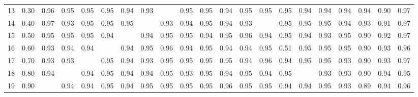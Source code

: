 \begin{table}[ht]
\begin{tabular}{rrrrrrrrrrrrrrrrrrrrr}
  13 & 0.30 & 0.96 & 0.95 & 0.95 & 0.95 & 0.94 & 0.93 &  & 0.95 & 0.95 & 0.94 & 0.95 & 0.95 & 0.95 & 0.94 & 0.94 & 0.94 & 0.94 & 0.90 & 0.97 \\ 
  14 & 0.40 & 0.97 & 0.93 & 0.95 & 0.95 & 0.95 &  & 0.93 & 0.94 & 0.95 & 0.94 & 0.93 &  & 0.95 & 0.95 & 0.95 & 0.94 & 0.93 & 0.91 & 0.97 \\ 
  15 & 0.50 & 0.95 & 0.95 & 0.95 & 0.94 &  & 0.94 & 0.95 & 0.95 & 0.94 & 0.95 & 0.96 & 0.94 & 0.95 & 0.94 & 0.93 & 0.95 & 0.90 & 0.92 & 0.97 \\ 
  16 & 0.60 & 0.93 & 0.94 & 0.94 &  & 0.94 & 0.95 & 0.96 & 0.94 & 0.95 & 0.94 & 0.94 & 0.95 & 0.51 & 0.95 & 0.95 & 0.95 & 0.90 & 0.93 & 0.96 \\ 
  17 & 0.70 & 0.93 & 0.93 &  & 0.95 & 0.94 & 0.93 & 0.95 & 0.95 & 0.95 & 0.95 & 0.94 & 0.96 & 0.94 & 0.95 & 0.95 & 0.93 & 0.90 & 0.93 & 0.97 \\ 
  18 & 0.80 & 0.94 &  & 0.94 & 0.95 & 0.94 & 0.94 & 0.95 & 0.93 & 0.95 & 0.94 & 0.95 & 0.94 & 0.95 &  & 0.93 & 0.93 & 0.90 & 0.94 & 0.95 \\ 
  19 & 0.90 &  & 0.94 & 0.94 & 0.95 & 0.94 & 0.95 & 0.95 & 0.95 & 0.95 & 0.96 & 0.95 & 0.95 & 0.94 & 0.94 & 0.95 & 0.93 & 0.89 & 0.94 & 0.96 \\ 
   \hline
\end{tabular}
\end{table}
